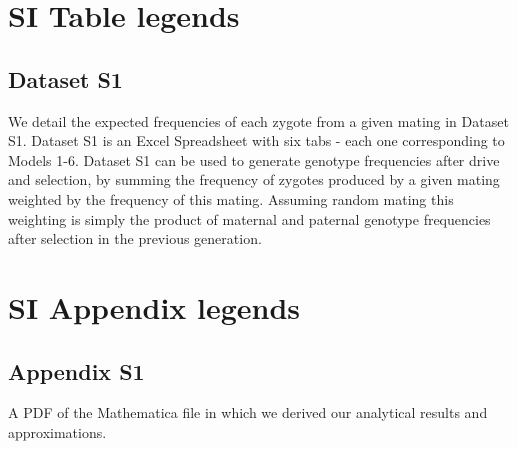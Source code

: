 \documentclass[12pt,letterpaper]{article}
\begin{document}
\section*{SI Table legends}
  \subsection*{Dataset S1}
  We detail the expected frequencies of each zygote from a given mating in Dataset S1. 
 Dataset S1 is an Excel Spreadsheet with six tabs - each one corresponding to Models 1-6. 
 Dataset S1 can be used to generate genotype frequencies after drive and selection, 
  by summing the  frequency of zygotes produced by a given mating weighted by the frequency of this mating. 
  Assuming random mating this weighting is simply the product of maternal and paternal genotype frequencies after selection in the previous generation. 


\section*{SI Appendix legends}
  \subsection*{Appendix S1}
A PDF of the Mathematica file in which we derived our analytical results and approximations.
\end{document}
